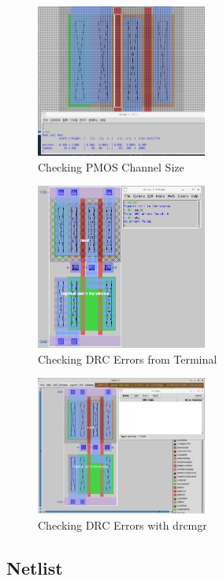 \documentclass{article}
\begin{document}
	\begin{figure}[H]
		\centerline{\includegraphics[width=0.5\textwidth]{nand_pmos_channel_sizing.png}}
		\caption{Checking PMOS Channel Size}
		\label{fig::nand_pmos_channel_sizing}
	\end{figure}
	
	\begin{figure}[H]
		\centerline{\includegraphics[width=0.5\textwidth]{nand_drc_errors_terminal.png}}
		\caption{Checking DRC Errors from Terminal}
		\label{fig::nand_drc_errors_terminal}
	\end{figure}
	
	\begin{figure}[H]
		\centerline{\includegraphics[width=0.5\textwidth]{nand_drc_errors_drcmgr.png}}
		\caption{Checking DRC Errors with drcmgr}
		\label{fig::nand_drc_errors_drcmgr}
	\end{figure}
	
	\subsection{Netlist}
\end{document}
